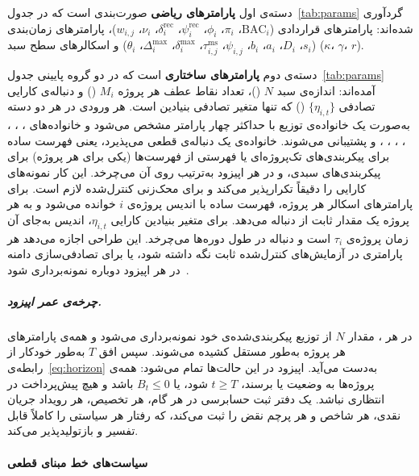 دسته‌ی اول \textbf{پارامترهای ریاضی} صورت‌بندی است که در
جدول~\ref{tab:params} گردآوری شده‌اند: پارامترهای قراردادی
($\mathrm{BAC}_i$، $\pi_i$، $\phi_i$، $\psi^{\mathrm{rec}}_i$،
$\delta^{\mathrm{rec}}_i$، $\nu_i$، $w_{i,j}$)، پارامترهای زمان‌بندی
($s_i$، $D_i$، $a_i$، $b_i$، $\psi_{i,j}$،
$\tau^{\mathrm{ms}}_{i,j}$، $\delta^{\max}_i$، $\Delta^{\max}_i$،
$\theta_i$) و اسکالرهای سطح سبد ($\kappa$، $\gamma$، $r$).

دسته‌ی دوم \textbf{پارامترهای ساختاری} است که در دو گروه پایینی
جدول~\ref{tab:params} آمده‌اند: اندازه‌ی سبد $N$
()، تعداد نقاط عطف هر پروژه $M_i$
() و دنباله‌ی کارایی تصادفی $\{\eta_{i,t}\}$
() که تنها متغیر تصادفی بنیادین است. هر ورودی در هر
دو دسته به‌صورت یک خانواده‌ی توزیع با حداکثر چهار پارامتر مشخص می‌شود
و خانواده‌های ، ، ، ،
، ، ،
 و  پشتیبانی می‌شوند. خانواده‌ی
 یک دنباله‌ی قطعی می‌پذیرد، یعنی فهرست ساده برای
پیکربندی‌های تک‌پروژه‌ای یا فهرستی از فهرست‌ها (یکی برای هر پروژه)
برای پیکربندی‌های سبدی، و در هر اپیزود به‌ترتیب روی آن می‌چرخد. این
کار نمونه‌های کارایی را دقیقاً تکرارپذیر می‌کند و برای محک‌زنی
کنترل‌شده لازم است. برای پارامترهای اسکالر هر پروژه، فهرست ساده با
اندیس پروژه‌ی $i$ خوانده می‌شود و به هر پروژه یک مقدار ثابت از دنباله
می‌دهد. برای متغیر بنیادین کارایی $\eta_{i,t}$، اندیس به‌جای آن زمان
پروژه‌ی $\tau_i$ است و دنباله در طول دوره‌ها می‌چرخد. این طراحی اجازه
می‌دهد هر پارامتری در آزمایش‌های کنترل‌شده ثابت نگه داشته شود، یا
برای تصادفی‌سازی دامنه در هر اپیزود دوباره نمونه‌برداری
شود~\citep{Tobin2017}.

\subparagraph{چرخه‌ی عمر اپیزود.}
در هر ، مقدار $N$ از توزیع پیکربندی‌شده‌ی خود نمونه‌برداری
می‌شود و همه‌ی پارامترهای هر پروژه به‌طور مستقل کشیده می‌شوند. سپس
افق $T$ به‌طور خودکار از رابطه‌ی~\eqref{eq:horizon} به‌دست می‌آید.
اپیزود در این حالت‌ها تمام می‌شود: همه‌ی پروژه‌ها به وضعیت
 یا  برسند، $t \geq T$ شود، یا
$B_t \leq 0$ باشد و هیچ پیش‌پرداخت در انتظاری نباشد. یک دفتر ثبت
حسابرسی  در هر گام، هر تخصیص، هر رویداد جریان نقدی، هر
شاخص  و هر پرچم نقض را ثبت می‌کند، که رفتار هر سیاستی را کاملاً
قابل تفسیر و بازتولیدپذیر می‌کند.

\paragraph{سیاست‌های خط مبنای قطعی}
\label{subsubsec:baselines}

